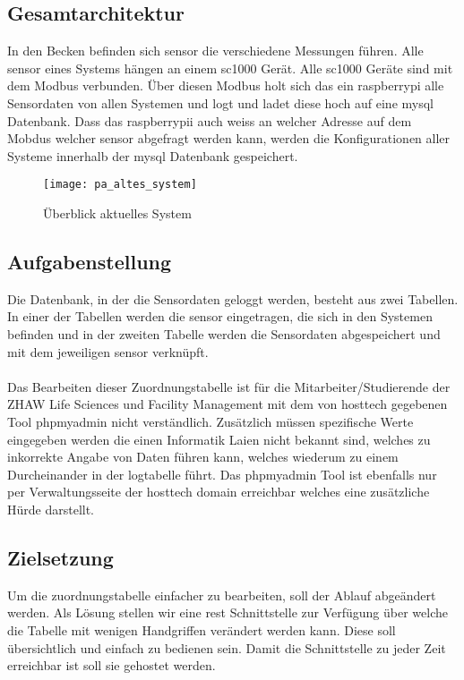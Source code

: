 \documentclass[../main.tex]{subfiles}
\begin{document}
	\subsection{Gesamtarchitektur}
	In den Becken befinden sich \gls{sensor} die verschiedene Messungen führen. Alle \gls{sensor} eines Systems hängen an einem \gls{sc1000} Gerät. Alle \gls{sc1000} Geräte sind mit dem Modbus verbunden. Über diesen Modbus holt sich das ein \gls{raspberrypi} alle Sensordaten von allen Systemen und logt und ladet diese hoch auf eine \gls{mysql} Datenbank. Dass das \gls{raspberrypi}i auch weiss an welcher Adresse auf dem Mobdus welcher \gls{sensor} abgefragt werden kann, werden die Konfigurationen aller Systeme innerhalb der \gls{mysql} Datenbank gespeichert.
	\begin{figure}[H]
		\centering
		\texttt{[image: pa\_altes\_system]}
		\caption{Überblick aktuelles System}
		\label{fig:pa_altes_system}
	\end{figure}
	
	\subsection{Aufgabenstellung}
	Die Datenbank, in der die Sensordaten geloggt werden, besteht aus zwei Tabellen. In einer der Tabellen werden die \gls{sensor} eingetragen, die sich in den Systemen befinden und in der zweiten Tabelle werden die Sensordaten abgespeichert und mit dem jeweiligen \gls{sensor} verknüpft. \\
	\\	
	Das Bearbeiten dieser Zuordnungstabelle ist für die Mitarbeiter/Studierende der ZHAW Life Sciences und Facility Management mit dem von \gls{hosttech} gegebenen Tool \gls{phpmyadmin} nicht verständlich. Zusätzlich müssen spezifische Werte eingegeben werden die einen Informatik Laien nicht bekannt sind, welches zu inkorrekte Angabe von Daten führen kann, welches wiederum zu einem Durcheinander in der \gls{logtabelle} führt. 
	Das \gls{phpmyadmin} Tool ist ebenfalls nur per Verwaltungsseite der \gls{hosttech} \gls{domain} erreichbar welches eine zusätzliche Hürde darstellt.
	
	\subsection{Zielsetzung}
	Um die \gls{zuordnungstabelle} einfacher zu bearbeiten, soll der Ablauf abgeändert werden. Als Lösung stellen wir eine \gls{rest} Schnittstelle zur Verfügung über welche die Tabelle mit wenigen Handgriffen verändert werden kann. 
	Diese soll übersichtlich und einfach zu bedienen sein. Damit die Schnittstelle zu jeder Zeit erreichbar ist soll sie gehostet werden.
\end{document}
